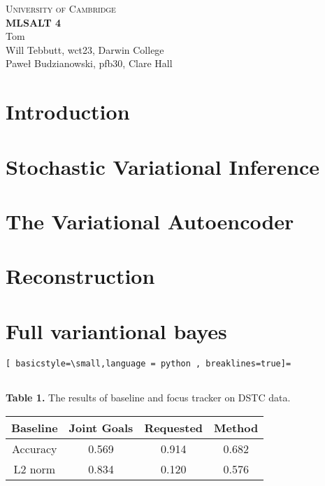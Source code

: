 \documentclass[10pt,a4paper]{article}
\begin{document}
\begin{center}
\Large{\textsc{
University of Cambridge}}\\
\vspace{.5cm}
\large\textbf{MLSALT 4}\\
\vspace{.5cm}
\large{Tom}\\
\large{Will Tebbutt, wct23, Darwin College}\\
\large{Paweł Budzianowski, pfb30, Clare Hall}\\
\end{center} 

\section{Introduction}


\section{Stochastic Variational Inference}


\section{The Variational Autoencoder}


\section{Reconstruction}


\section{Full variantional bayes}


\begin{lstlisting}[ basicstyle=\small,language = python , breaklines=true]=


\end{lstlisting}



 {\small \textbf{Table 1.} The results of baseline and focus tracker on DSTC data.}
\begin{center}
\begin{tabular}{c | c c c} \label{tab1}
Baseline &  Joint Goals & Requested & Method \\ \hline 
Accuracy & 0.569 & 0.914 & 0.682\\
L2 norm & 0.834  & 0.120& 0.576\\
\end{tabular} 
\end{center}
\end{document}

